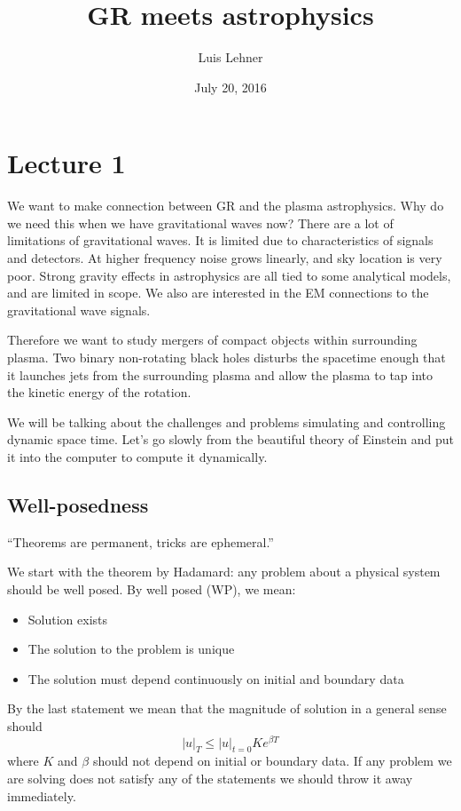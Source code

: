 \documentclass[letterpaper, 11pt]{article}
\numberwithin{equation}{section}
\numberwithin{figure}{section}
\begin{document}
\title{GR meets astrophysics}
\author{Luis Lehner}
\date{July 20, 2016}

\maketitle

\section{Lecture 1}

We want to make connection between GR and the plasma astrophysics. Why do we
need this when we have gravitational waves now? There are a lot of limitations
of gravitational waves. It is limited due to characteristics of signals and
detectors. At higher frequency noise grows linearly, and sky location is very
poor. Strong gravity effects in astrophysics are all tied to some
analytical models, and are limited in scope. We also are interested in the EM
connections to the gravitational wave signals.

Therefore we want to study mergers of compact objects within surrounding plasma.
Two binary non-rotating black holes disturbs the spacetime enough that it
launches jets from the surrounding plasma and allow the plasma to tap into the
kinetic energy of the rotation.

We will be talking about the challenges and problems simulating and controlling
dynamic space time. Let's go slowly from the beautiful theory of Einstein and
put it into the computer to compute it dynamically.

\subsection{Well-posedness}

``Theorems are permanent, tricks are ephemeral.''

We start with the theorem by Hadamard: any problem about a physical system
should be well posed. By well posed (WP), we mean:
\begin{itemize}
\item Solution exists
    \item The solution to the problem is unique
    \item The solution must depend continuously on initial and boundary data
\end{itemize}
By the last statement we mean that the magnitude of solution in a general sense
should
\begin{equation}
  \label{eq:1}
  \left| u \right|_T \leq \left| u \right|_{t = 0} K e^{\beta T}
\end{equation}
where $K$ and $\beta$ should not depend on initial or boundary data. If any
problem we are solving does not satisfy any of the statements we should throw it
away immediately.
\end{document}
